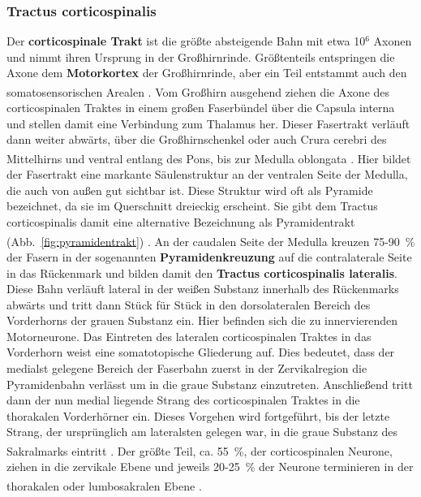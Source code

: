 \subsubsection{Tractus corticospinalis}  \label{subsubsec:corticospinalis}
Der \textbf{corticospinale Trakt} ist die größte absteigende Bahn mit etwa 10$^{6}$ Axonen und nimmt ihren Ursprung in der Großhirnrinde. Größtenteils entspringen die Axone dem \textbf{Motorkortex} der Großhirnrinde, aber ein Teil entstammt auch den somatosensorischen Arealen \textsuperscript{\cite[14]{neurowissenschaften_baer}}. 
Vom Großhirn ausgehend ziehen die Axone des corticospinalen Traktes in einem großen Faserbündel über die Capsula interna und stellen damit eine Verbindung zum Thalamus her. Dieser Fasertrakt verläuft dann weiter abwärts, über die Großhirnschenkel oder auch Crura cerebri des Mittelhirns und ventral entlang des Pons, bis zur Medulla oblongata \textsuperscript{\cite[8]{crossman2014neuroanatomy}}. Hier bildet der Fasertrakt eine markante Säulenstruktur an der ventralen Seite der Medulla, die auch von außen gut sichtbar ist. Diese Struktur wird oft als Pyramide bezeichnet, da sie im Querschnitt dreieckig erscheint. Sie gibt dem Tractus corticospinalis damit eine alternative Bezeichnung als Pyramidentrakt (Abb.~\ref{fig:pyramidentrakt}) \textsuperscript{\cite[14]{neurowissenschaften_baer}}. An der caudalen Seite der Medulla kreuzen 75-90~\% der Fasern in der sogenannten \textbf{Pyramidenkreuzung} auf die contralaterale Seite in das Rückenmark und bilden damit den \textbf{Tractus corticospinalis lateralis}. Diese Bahn verläuft lateral in der weißen Substanz innerhalb des Rückenmarks abwärts und tritt dann Stück für Stück in den dorsolateralen Bereich des Vorderhorns der grauen Substanz ein. Hier befinden sich die zu innervierenden Motorneurone. Das Eintreten des lateralen corticospinalen Traktes in das Vorderhorn weist eine somatotopische Gliederung auf. Dies bedeutet, dass der medialst gelegene Bereich der Faserbahn zuerst in der Zervikalregion die Pyramidenbahn verlässt um in die graue Substanz einzutreten. Anschließend tritt dann der nun medial liegende Strang des corticospinalen Traktes in die thorakalen Vorderhörner ein. Dieses Vorgehen wird fortgeführt, bis der letzte Strang, der ursprünglich am lateralsten gelegen war, in die graue Substanz des Sakralmarks eintritt \textsuperscript{\cite[3]{trepel2011neuroanatomie}}. Der größte Teil, ca. 55~\%, der corticospinalen Neurone, ziehen in die zervikale Ebene und jeweils 20-25~\% der Neurone terminieren in der thorakalen oder lumbosakralen Ebene \textsuperscript{\cite[8]{crossman2014neuroanatomy}}. \\
